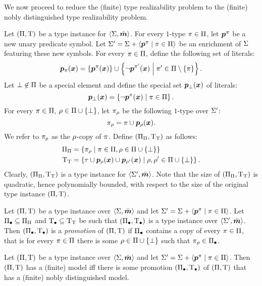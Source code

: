 We now proceed to reduce the (finite) type realizability problem to the (finite)
nobly distinguished type realizability problem.
\begin{definition}
Let $(\Pi,\mathrm{T})$ be a type instance for $\left\langle \mathrm{\Sigma},\bar{\bm{m}} \right\rangle$.
For every $1$-type $\pi \in \Pi$, let $\bm{p}^{\pi}$ be a new unary predicate
symbol. Let $\mathrm{\Sigma'} = \mathrm{\Sigma} + \left\langle \bm{p}^{\pi} \mathrel{}\middle|\mathrel{} \pi \in \Pi \right\rangle$ be an
enrichment of $\mathrm{\Sigma}$ featuring these new symbols. For every $\pi \in \Pi$,
define the following set of literals:
\[
  \bm{p}_{\pi}(\bm{x}) = \left\{\bm{p}^{\pi}(\bm{x})\right\} \cup
  \left\{\lnot\bm{p}^{{\pi'}}(\bm{x})\mathrel{}\middle|\mathrel{}{\pi'} \in \Pi \setminus \left\{\pi\right\}\right\}.
\]
Let $\bot \not\in \Pi$ be a special element and define the special set
$\bm{p}_{\bot}(\bm{x})$ of literals:
\[
  \bm{p}_{\bot}(\bm{x}) = 
  \left\{\lnot\bm{p}^{\pi}(\bm{x})\mathrel{}\middle|\mathrel{}\pi \in \Pi\right\}.
\]
For every $\pi \in \Pi$, $\rho \in \Pi\cup\left\{\bot\right\}$,
let ${\pi}_{\rho}$ be the following $1$-type over $\mathrm{\Sigma'}$:
\[
  {\pi}_{\rho} = \pi \cup \bm{p}_{\rho}(\bm{x}).
\]
We refer to ${\pi}_{\rho}$ as the $\rho$-copy of $\pi$.
Define $({\Pi}_{\Pi},{\mathrm{T}}_{\mathrm{T}})$ as follows:
\begin{align*}
  {\Pi}_{\Pi} &= 
  \left\{{\pi}_{\rho}\mathrel{}\middle|\mathrel{}\pi\in\Pi, \rho\in\Pi\cup\left\{\bot\right\}\right\} \\
  {\mathrm{T}}_{\mathrm{T}} &= \left\{\tau \cup \bm{p}_{\rho}(\bm{x}) \cup
  \bm{p}_{{\rho'}}(\bm{x})\mathrel{}\middle|\mathrel{}\rho,{\rho'} \in \Pi\cup\left\{\bot\right\}\right\}.
\end{align*}
Clearly, $({\Pi}_{\Pi},{\mathrm{T}}_{\mathrm{T}})$ is a type instance for
$\left\langle \mathrm{\Sigma'},\bar{\bm{m}} \right\rangle$.
Note that the size of $({\Pi}_{\Pi},{\mathrm{T}}_{\mathrm{T}})$ is quadratic, hence
polynomially bounded, with respect to the size of the original type instance
$(\Pi,\mathrm{T})$.
\end{definition}
\begin{definition}
Let $(\Pi,\mathrm{T})$ be a type instance over $\left\langle \mathrm{\Sigma},\bar{\bm{m}} \right\rangle$ and let
$\mathrm{\Sigma'} = \mathrm{\Sigma} + \left\langle \bm{p}^{\pi} \mathrel{}\middle|\mathrel{} \pi \in \Pi \right\rangle$.
Let $\Pi_{\bullet} \subseteq {\Pi}_{\Pi}$ and $\mathrm{T}_{\bullet} \subseteq {\mathrm{T}}_{\mathrm{T}}$ be
such that $(\Pi_{\bullet},\mathrm{T}_{\bullet})$ is a type instance over $\left\langle \mathrm{\Sigma'},\bar{\bm{m}} \right\rangle$.
Then $(\Pi_{\bullet},\mathrm{T}_{\bullet})$ is a \emph{promotion} of $(\Pi,\mathrm{T})$ if
$\Pi_{\bullet}$ contains a copy of every $\pi \in \Pi$, 
that is for every $\pi \in \Pi$ there is some $\rho \in
\Pi\cup\left\{\bot\right\}$ such that ${\pi}_{\rho} \in \Pi_{\bullet}$.
\end{definition}
\begin{lemma}\label{lem:noble-distinguishability}
Let $(\Pi,\mathrm{T})$ be a type instance over $\left\langle \mathrm{\Sigma},\bar{\bm{m}} \right\rangle$ and let
$\mathrm{\Sigma'} = \mathrm{\Sigma} + \left\langle \bm{p}^{\pi} \mathrel{}\middle|\mathrel{} \pi \in \Pi \right\rangle$.
Then $(\Pi,\mathrm{T})$ has a (finite) model iff there is some promotion
$(\Pi_{\bullet},\mathrm{T}_{\bullet})$ of $(\Pi,\mathrm{T})$ that has a (finite) nobly distinguished
model.
\end{lemma}
